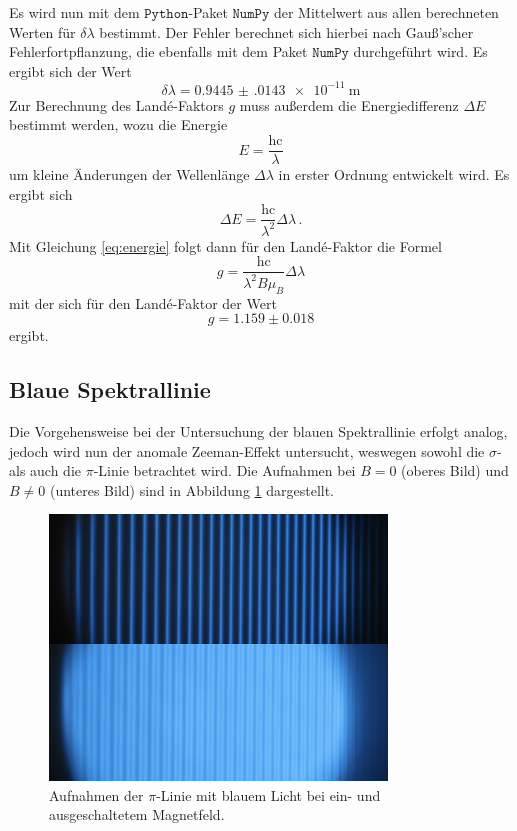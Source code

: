 Es wird nun mit dem $\texttt{Python}$-Paket $\texttt{NumPy}$ der Mittelwert aus allen
berechneten Werten für $\delta \lambda$ bestimmt. Der Fehler berechnet sich hierbei nach Gauß'scher Fehlerfortpflanzung,
die ebenfalls mit dem Paket $\texttt{NumPy}$ durchgeführt wird. Es ergibt sich der Wert
\begin{equation*}
    \delta \lambda = \SI{0.9445(0143)e-11}{\meter}
\end{equation*}
Zur Berechnung des Landé-Faktors $g$ muss außerdem die Energiedifferenz $\Delta E$ bestimmt werden, wozu die Energie
\begin{equation*}
    E = \frac{\text{hc}}{\lambda}
\end{equation*} 
um kleine Änderungen der Wellenlänge $\Delta \lambda$ in erster Ordnung entwickelt wird. Es ergibt sich
\begin{equation*}
    \Delta E = \frac{\text{hc}}{\lambda^2} \Delta \lambda \, .
\end{equation*}
Mit Gleichung \eqref{eq:energie} folgt dann für den Landé-Faktor die Formel 
\begin{equation} 
    \label{eq:landee}
    g = \frac{\text{hc}}{\lambda^2 B \mu_B} \Delta \lambda
\end{equation}
mit der sich für den Landé-Faktor der Wert
\begin{equation*}
    g = 1.159\pm 0.018
\end{equation*}
ergibt.

\subsection{Blaue Spektrallinie}
Die Vorgehensweise bei der Untersuchung der blauen Spektrallinie erfolgt analog, jedoch wird nun der anomale Zeeman-Effekt
untersucht, weswegen sowohl die $\sigma$- als auch die $\pi$-Linie betrachtet wird. 
Die Aufnahmen bei $B = 0$ (oberes Bild) und $B \neq 0$ (unteres Bild) sind in Abbildung \ref{fig:afig3} dargestellt.
\FloatBarrier
\begin{figure}
    \centering
    \includegraphics[width=0.8\textwidth]{pi.jpg}
    \caption{Aufnahmen der $\pi$-Linie mit blauem Licht bei ein- und ausgeschaltetem Magnetfeld.}
    \label{fig:afig3}
\end{figure}
\FloatBarrier
